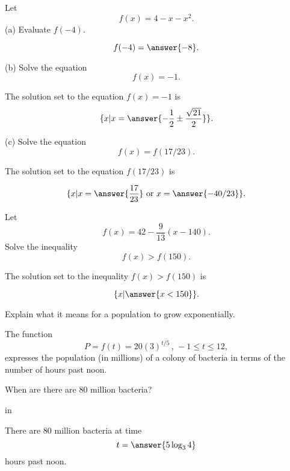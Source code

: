 \documentclass{ximera}
\newcommand{\pskip}{\vskip 0.1 in}
\begin{document}
\begin{question} \label{Qpdf0gbvgbrtg}
Let
\[
      f(x) = 4 - x - x^2 .
\]
(a) Evaluate $f(-4)$.

\[
    f(-4) = \answer{-8} .
\]

(b) Solve the equation 
\[
      f(x) = -1 .
\]

The solution set to the equation $f(x)=-1$ is
\[
  \{  x | x = \answer{-\frac{1}{2} \pm \frac{\sqrt{21}}{2}}  \}.
\]

(c) Solve the equation
\[
       f(x) = f(17/23) .
\]

The solution set to the equation $f(17/23)$ is

\[
   \{  x | x = \answer{\frac{17}{23}} \text{ or } x=\answer{-40/23}  \}.
\]

\end{question}


\begin{question}  \label{Qdfdcg4tythyh5t}
Let 
\[
       f(x) = 42 - \frac{9}{13}(x - 140) .
\]
Solve the inequality
\[
     f(x) > f(150) .
\]

The solution set to the inequality $f(x)>f(150)$ is

\[
    \{  x | \answer{x < 150}  \}.
\]

\end{question}


\begin{question}  \label{Eer5htrree}
Explain what it means for a population to grow exponentially.
\end{question}

\begin{question}
The function
\[
  P = f(t) = 20 (3)^{t/5} \, , \, -1 \leq t \leq 12 ,
\]
expresses the population (in millions) of a colony of bacteria in terms of the number of hours past noon. 

When are there are 80 million bacteria?

\pskip

There are 80 million bacteria at time
\[
 t = \answer{5 \log_3 4}
\]
hours past noon.
\end{question}
\end{document}
